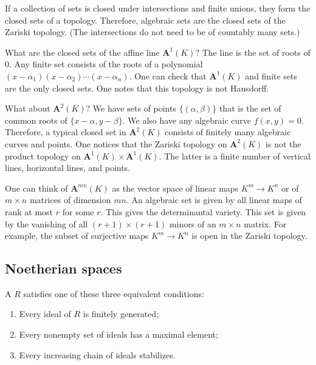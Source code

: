 \documentclass[11pt, oneside,margin=1in]{article}
\begin{document}
If a collection of sets is closed under intersections and finite unions, they form the closed sets of a topology. Therefore, algebraic sets are the closed sets of the Zariski topology. (The intersections do not need to be of countably many sets.)

What are the closed sets of the affine line $\mathbf{A}^1(K)$? The line is the set of roots of $0$. Any finite set consists of the roots of a polynomial $(x-\alpha_1)(x-\alpha_2)\cdots(x-\alpha_n)$. One can check that $\mathbf{A}^1(K)$ and finite sets are the only closed sets. One notes that this topology is not Hausdorff.

What about $\mathbf{A}^2(K)$? We have sets of points $\{(\alpha,\beta)\}$ that is the set of common roots of $\{x-\alpha, y-\beta\}$. We also have any algebraic curve $f(x,y) =0$. Therefore, a typical closed set in $\mathbf{A}^2(K)$ consists of finitely many algebraic curves and points. One notices that the Zariski topology on $\mathbf{A}^2(K)$ is not the product topology on $\mathbf{A}^1(K)\times \mathbf{A}^1(K)$. The latter is a finite number of vertical lines, horizontal lines, and points.

\begin{example}\label{}\text{}
One can think of $\mathbf{A}^{mn}(K)$ as the vector space of linear maps $K^m \longrightarrow K^n$ or of $m\times n$ matrices of dimension $mn$. An algebraic set is given by all linear maps of rank at most $r$ for some $r$. This gives the determinantal variety. This set is given by the vanishing of all $(r+1)\times  (r+1)$ minors of an $m\times n $ matrix. For example, the subset of surjective maps $K^m\longrightarrow K^n$ is open in the Zariski topology.
\end{example}

\subsection{Noetherian spaces}
\begin{definition}[ ]\label{}\text{}
A  $R$ satisfies one of these three equivalent conditions:
\begin{enumerate}
	\item Every ideal of $R$ is finitely generated;
	\item Every nonempty set of ideals has a maximal element;
	\item Every increasing chain of ideals stabilizes. 
\end{enumerate}
\end{definition}
\end{document}
